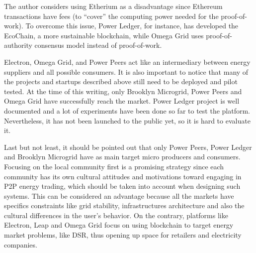 The author considers using Etherium as a disadvantage since Ethereum transactions have fees (to “cover” the computing power needed for the proof-of-work). To overcome this issue, Power Ledger, for instance, has developed the EcoChain, a more sustainable blockchain, while Omega Grid uses proof-of-authority consensus model instead of proof-of-work.



Electron, Omega Grid, and Power Peers act like an intermediary between energy suppliers and all possible consumers. It is also important to notice that many of the projects and startups described above still need to be deployed and pilot tested. At the time of this writing, only Brooklyn Microgrid, Power Peers and Omega Grid have successfully reach the market. Power Ledger project is well documented and a lot of experiments have been done so far to test the platform. Nevertheless, it has not been launched to the public yet, so it is hard to evaluate it.



Last but not least, it should be pointed out that only Power Peers, Power Ledger and Brooklyn Microgrid have as main target micro producers and consumers. Focusing on the local community first is a promising strategy since each community has its own cultural attitudes and motivations toward engaging in \ac{P2P} energy trading, which should be taken into account when designing such systems. This can be considered an advantage because all the markets have specifics constraints like grid stability, infrastructures architecture and also the cultural differences in the user’s behavior. On the contrary, platforms like Electron, Leap and Omega Grid focus on using blockchain to target energy market problems, like \ac{DSR}, thus opening up space for retailers and electricity companies.   
